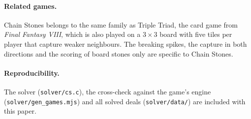 \documentclass[11pt,a4paper]{article}
\begin{document}
\paragraph{Related games.} Chain Stones belongs to the same family as Triple Triad, the card game from \emph{Final Fantasy VIII}, which is also played on a $3\times3$ board with five tiles per player that capture weaker neighbours. The breaking spikes, the capture in both directions and the scoring of board stones only are specific to Chain Stones.

\paragraph{Reproducibility.} The solver (\texttt{solver/cs.c}), the cross-check against the game's engine (\texttt{solver/gen\_games.mjs}) and all solved deals (\texttt{solver/data/}) are included with this paper.
\end{document}
